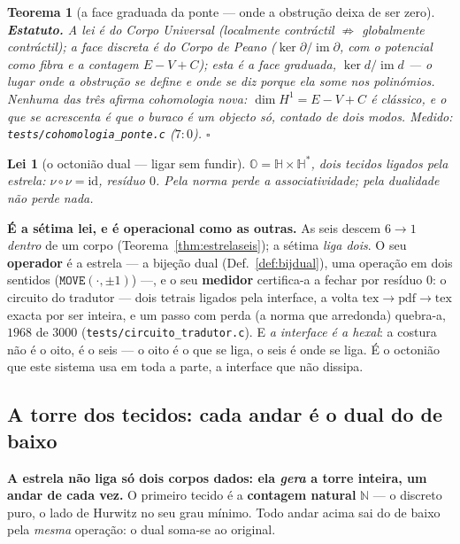 \documentclass[11pt,a4paper]{article}
\newcommand{\code}[1]{\texttt{\small #1}}
\newtheorem{teorema}{Teorema}
\newtheorem{lei}{Lei}
\begin{document}
\begin{teorema}[a face graduada da ponte --- onde a obstrução deixa de ser
zero]
\textbf{Estatuto.} A lei é do \emph{Corpo Universal} (localmente
contráctil $\not\Rightarrow$ globalmente contráctil); a face discreta é
do \emph{Corpo de Peano} ($\ker\partial/\operatorname{im}\partial$,
com o potencial como fibra e a contagem $E-V+C$); esta é a face
graduada, $\ker d/\operatorname{im}d$ --- o lugar onde a obstrução se define
e onde se diz \emph{porque} ela some nos polinómios. Nenhuma das três
afirma cohomologia nova: $\dim H^{1}=E-V+C$ é clássico, e o que se
acrescenta é que o buraco é \emph{um objecto só}, contado de dois modos.
\emph{Medido:} \code{tests/cohomologia\_ponte.c} ($7{:}0$).
$\square$
\end{teorema}

\setcounter{lei}{6}
\begin{lei}[o octonião dual --- ligar sem fundir]\label{lei:octoniao}
$\mathbb{O}=\mathbb{H}\times\mathbb{H}^{*}$, dois tecidos ligados pela estrela: $\nu\circ\nu=\mathrm{id}$,
resíduo $0$. Pela norma perde a associatividade; pela dualidade não perde nada.
\end{lei}

\noindent \textbf{É a sétima lei, e é operacional como as outras.} As seis descem $6\to1$ \emph{dentro} de
um corpo (Teorema~\ref{thm:estrelaseis}); a sétima \emph{liga dois}. O seu \textbf{operador} é a estrela
--- a bijeção dual (Def.~\ref{def:bijdual}), uma operação em dois sentidos ($\texttt{MOVE}(\cdot,\pm1)$)
---, e o seu \textbf{medidor} certifica-a a fechar por resíduo $0$: o circuito do tradutor --- dois
tetrais ligados pela interface, a volta $\text{tex}\to\text{pdf}\to\text{tex}$ exacta por ser inteira, e um
passo com perda (a norma que arredonda) quebra-a, $1968$ de $3000$ (\code{tests/circuito\_tradutor.c}). E
\emph{a interface é a hexal}: a costura não é o oito, é o seis --- o oito é o que se liga, o seis é onde
se liga. É o octonião que este sistema usa em toda a parte, a interface que não dissipa.

\subsection*{A torre dos tecidos: cada andar é o dual do de baixo}\label{sub:tecidos}

\textbf{A estrela não liga só dois corpos dados: ela \emph{gera} a torre inteira, um andar de cada
vez.} O primeiro tecido é a \textbf{contagem natural} $\mathbb{N}$ --- o discreto puro, o lado de Hurwitz no
seu grau mínimo. Todo andar acima sai do de baixo pela \emph{mesma} operação: o dual soma-se ao
original.
\end{document}
